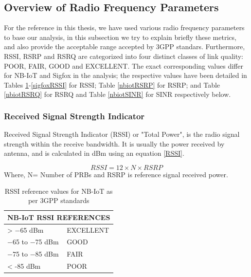 \documentclass[12pt]{article}
\begin{document}
\subsection{Overview of Radio Frequency Parameters}

For the reference in this thesis, we have used various radio frequency parameters to base our analysis, in this subsection we try to explain briefly these metrics, and also provide the acceptable range accepted by 3GPP standars. Furthermore, RSSI, RSRP and RSRQ are categorized into four distinct classes of link quality: POOR, FAIR, GOOD and EXCELLENT. The exact corresponding values differ for NB-IoT and Sigfox in the analysis; the respective values have been detailed in Tables \ref{nbiotRSSI}-\ref{sigfoxRSSI} for RSSI;  Table \ref{nbiotRSRP} for RSRP; and Table \ref{nbiotRSRQ} for RSRQ and Table \ref{nbiotSINR} for SINR respectively below.


\subsubsection{Received Signal Strength Indicator}
Received Signal Strength Indicator (RSSI) or "Total  Power", is the radio  signal  strength  within  the  receive bandwidth. It is usually the power received by antenna, and is  calculated in dBm using an equation \ref{RSSI}.

\begin{equation}
      RSSI = {12 \times N \times RSRP}
      \label{RSSI}
\end{equation}
Where, N= Number of PRBs and RSRP is reference signal received power.

\begin{table}[h]

\centering
\caption {RSSI reference values for NB-IoT as per 3GPP standards \cite{3GPP,sikora2019performance}}

\begin{tabular}{|p{5cm}|p{5cm}|}
\hline
\multicolumn{2}{|c|}{NB-IoT RSSI REFERENCES} \\ \hline
 > −65 dBm                           & EXCELLENT                     \\ \hline
−65 to −75 dBm                      & GOOD                          \\ \hline
−75 to −85 dBm                      & FAIR                          \\ \hline
< -85 dBm                           & POOR                          \\ \hline
\end{tabular}
\label{nbiotRSSI}

\end{table}
\end{document}
